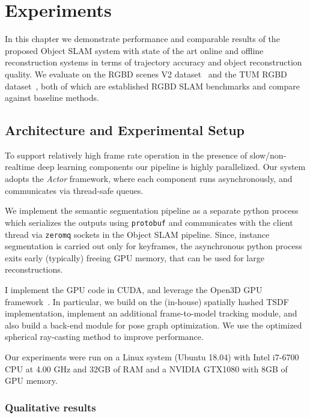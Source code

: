 \chapter{Experiments}

In this chapter we demonstrate performance and comparable results of the proposed Object SLAM system with state of the art online and offline reconstruction systems in terms of trajectory accuracy and object reconstruction quality. We evaluate on the RGBD scenes V2 dataset~\cite{laiUnsupervisedFeatureLearning2014} and the TUM RGBD dataset~\cite{sturmBenchmarkEvaluationRGBD2012}, both of which are established RGBD SLAM benchmarks and compare against baseline methods.

\section{Architecture and Experimental Setup}


To support relatively high frame rate operation in the presence of slow/non-realtime deep learning components our pipeline is highly parallelized. Our system adopts the \textit{Actor} framework, where each component runs asynchronously, and communicates via thread-safe queues.

We implement the semantic segmentation pipeline as a separate python process which serializes the outputs using \texttt{protobuf} and communicates with the client thread via \texttt{zeromq} sockets in the Object SLAM pipeline. Since, instance segmentation is carried out only for keyframes, the asynchronous python process exits early (typically) freeing GPU memory, that can be used for large reconstructions.

I implement the GPU code in CUDA, and leverage the Open3D GPU framework~\cite{dongGPUAcceleratedRobust2019}. In particular, we build on the (in-house) spatially hashed TSDF implementation, implement an additional frame-to-model tracking module, and also build a back-end module for pose graph optimization. We use the optimized spherical ray-casting method to improve performance.

Our experiments were run on a Linux system (Ubuntu 18.04) with Intel i7-6700 CPU at 4.00 GHz and 32GB of RAM and a NVIDIA GTX1080 with 8GB of GPU memory.

\subsection{Qualitative results}

